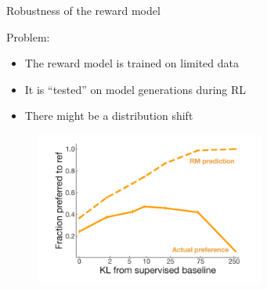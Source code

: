 \documentclass[usenames,dvipsnames,notes,11pt,aspectratio=169,hyperref={colorlinks=true, linkcolor=blue}]{beamer}
\begin{document}
\begin{frame}
    {Robustness of the reward model}

    Problem:\\
    \begin{itemize}
        \item The reward model is trained on limited data
        \item It is ``tested'' on model generations during RL
        \item There might be a distribution shift
    \end{itemize}

        \begin{figure}
            \includegraphics[height=5cm]{figures/reward-vs-kl}
        \end{figure}
\end{frame}
\end{document}
